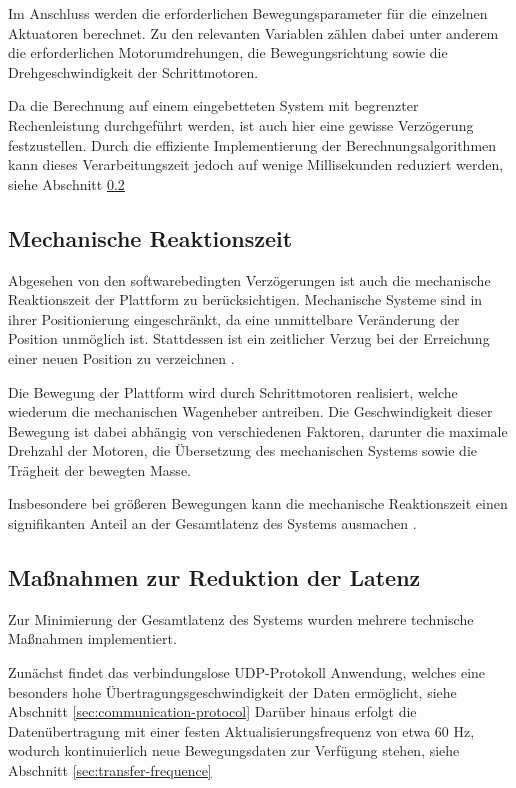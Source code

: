 Im Anschluss werden die erforderlichen Bewegungsparameter für die einzelnen Aktuatoren berechnet. Zu den relevanten Variablen zählen dabei unter anderem die erforderlichen Motorumdrehungen, die Bewegungsrichtung sowie die Drehgeschwindigkeit der Schrittmotoren.

Da die Berechnung auf einem eingebetteten System mit begrenzter Rechenleistung durchgeführt werden, ist auch hier eine gewisse Verzögerung festzustellen. Durch die effiziente Implementierung der Berechnungsalgorithmen kann dieses Verarbeitungszeit jedoch auf wenige Millisekunden reduziert werden, siehe Abschnitt \ref{sec:reduction-latency}

\subsection{Mechanische Reaktionszeit}
Abgesehen von den softwarebedingten Verzögerungen ist auch die mechanische Reaktionszeit der Plattform zu berücksichtigen. Mechanische Systeme sind in ihrer Positionierung eingeschränkt, da eine unmittelbare Veränderung der Position unmöglich ist. Stattdessen ist ein zeitlicher Verzug bei der Erreichung einer neuen Position zu verzeichnen \cite{Feynman2016}.

Die Bewegung der Plattform wird durch Schrittmotoren realisiert, welche wiederum die mechanischen Wagenheber antreiben. Die Geschwindigkeit dieser Bewegung ist dabei abhängig von verschiedenen Faktoren, darunter die maximale Drehzahl der Motoren, die Übersetzung des mechanischen Systems sowie die Trägheit der bewegten Masse.

Insbesondere bei größeren Bewegungen kann die mechanische Reaktionszeit einen signifikanten Anteil an der Gesamtlatenz des Systems ausmachen \cite{Feynman2016}.

\subsection{Maßnahmen zur Reduktion der Latenz} \label{sec:reduction-latency}
Zur Minimierung der Gesamtlatenz des Systems wurden mehrere technische Maßnahmen implementiert. 

Zunächst findet das verbindungslose UDP-Protokoll Anwendung, welches eine besonders hohe Übertragungsgeschwindigkeit der Daten ermöglicht, siehe Abschnitt \ref{sec:communication-protocol} Darüber hinaus erfolgt die Datenübertragung mit einer festen Aktualisierungsfrequenz von etwa 60 Hz, wodurch kontinuierlich neue Bewegungsdaten zur Verfügung stehen, siehe Abschnitt \ref{sec:transfer-frequence}

